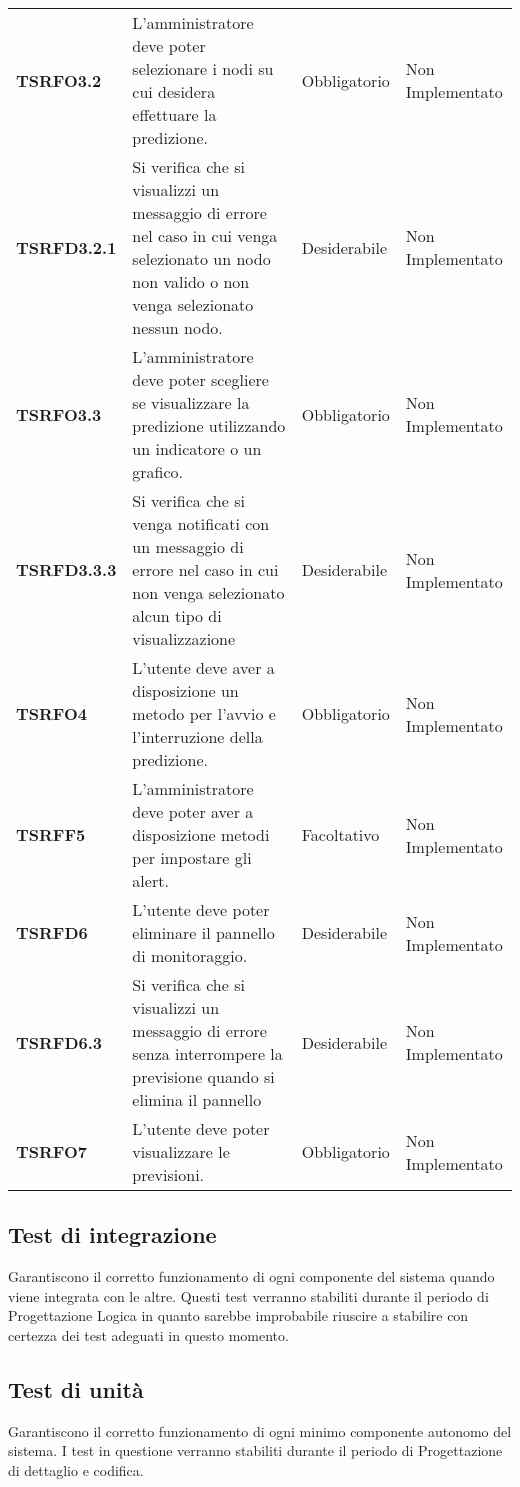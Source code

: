 \documentclass[../piano-di-qualifica.tex]{subfiles}
\begin{document}
\begin{longtable}[H]{>{\centering\bfseries}m{2cm} >{\centering}m{8cm} >{\centering}m{2.5cm} >{\centering\arraybackslash}m{3.5cm}}
  \textbf{TSRFO3.2} & L’amministratore deve poter selezionare i nodi su cui desidera effettuare la predizione. & Obbligatorio & Non Implementato \\
  \textbf{TSRFD3.2.1} & Si verifica che si visualizzi un messaggio di errore nel caso in cui venga selezionato un nodo non valido o non venga selezionato nessun nodo. & Desiderabile & Non Implementato \\

  \textbf{TSRFO3.3} & L’amministratore deve poter scegliere se visualizzare la predizione utilizzando un indicatore o un grafico. & Obbligatorio & Non Implementato \\

  \textbf{TSRFD3.3.3} & Si verifica che si venga notificati con un messaggio di errore nel caso in cui non venga selezionato alcun tipo di visualizzazione & Desiderabile & Non Implementato \\
  
  \textbf{TSRFO4} & L'utente deve aver a disposizione un metodo per l’avvio e l’interruzione della predizione. & Obbligatorio & Non Implementato \\

  \textbf{TSRFF5} & L'amministratore deve poter aver a disposizione metodi per impostare gli alert. & Facoltativo & Non Implementato \\
  
  \textbf{TSRFD6} & L'utente deve poter eliminare il pannello di monitoraggio. & Desiderabile & Non Implementato \\
  \textbf{TSRFD6.3} & Si verifica che si visualizzi un messaggio di errore senza interrompere la previsione quando si elimina il pannello & Desiderabile & Non Implementato \\
  
  \textbf{TSRFO7} & L’utente deve poter visualizzare le previsioni. & Obbligatorio & Non Implementato \\


\end{longtable}

\subsection{Test di integrazione}
\label{sub:test_di_integrazione}
Garantiscono il corretto funzionamento di ogni componente del sistema quando viene integrata con le altre.
Questi test verranno stabiliti durante il periodo di Progettazione Logica in quanto sarebbe improbabile riuscire a stabilire con certezza dei test adeguati in questo momento.

\subsection{Test di unità}
\label{sub:test_di_unita}
Garantiscono il corretto funzionamento di ogni minimo componente autonomo del sistema.
I test in questione verranno stabiliti durante il periodo di Progettazione di dettaglio e codifica.
\end{document}
